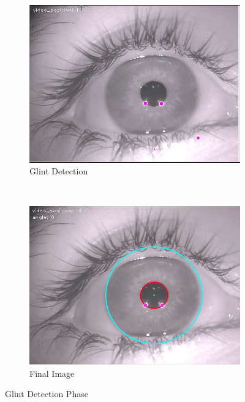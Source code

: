 \begin{figure}[h!]
	\centering
	
	\begin{subfigure}[b]{0.5\textwidth}
		\includegraphics[width=\textwidth]{Handin1/images/glitDetection.png}
		\caption{Glint Detection}
		\label{subfig:glints}
	\end{subfigure}%
	~
	\begin{subfigure}[b]{0.5\textwidth}
		\centering
		\includegraphics[width=\textwidth]{Handin1/images/final.png}
		\caption{Final Image}
		\label{subfig:final}
	\end{subfigure}
	
	\caption{Glint Detection Phase}
\end{figure}




